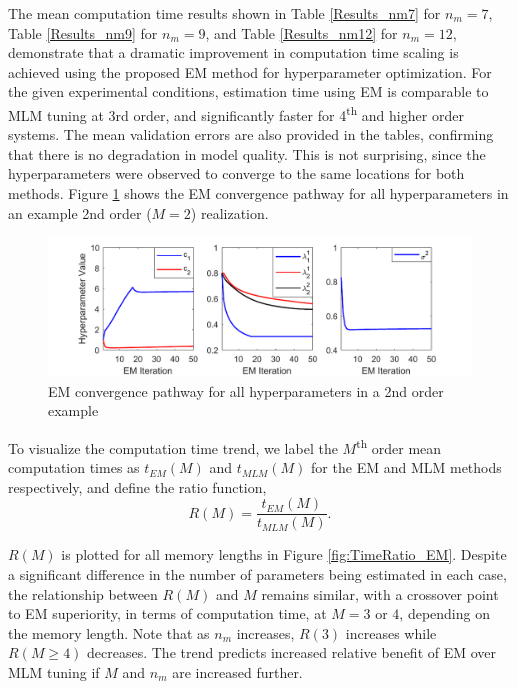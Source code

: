 The mean computation time results shown in Table \ref{Results_nm7} for $n_m = 7$, Table \ref{Results_nm9} for $n_m = 9$, and Table \ref{Results_nm12} for $n_m =12$, demonstrate that a dramatic improvement in computation time scaling is achieved using the proposed EM method for hyperparameter optimization. For the given experimental conditions, estimation time using EM is comparable to MLM tuning at 3rd order, and significantly faster for 4\textsuperscript{th} and higher order systems. The mean validation errors are also provided in the tables, confirming that there is no degradation in model quality. This is not surprising, since the hyperparameters were observed to converge to the same locations for both methods. Figure \ref{fig:EMhyperparams_converging} shows the EM convergence pathway for all hyperparameters in an example 2nd order ($M=2$) realization.

\begin{figure}[h]
\centering
\includegraphics[width = \textwidth]{Chapter4_EM/HyperparamConvergence.pdf}
\caption{EM convergence pathway for all hyperparameters in a 2nd order example}
\label{fig:EMhyperparams_converging}
\end{figure}

To visualize the computation time trend, we label the $M$\textsuperscript{th} order mean computation times as $t_{EM}(M)$ and $t_{MLM}(M)$ for the EM and MLM methods respectively, and define the ratio function, 
\begin{equation}
R(M) = \frac{t_{EM}(M)}{t_{MLM}(M)}.
\end{equation}

$R(M)$ is plotted for all memory lengths in Figure \ref{fig:TimeRatio_EM}. Despite a significant difference in the number of parameters being estimated in each case, the relationship between $R(M)$ and $M$ remains similar, with a crossover point to EM superiority, in terms of computation time, at $M=3 \text{ or } 4$, depending on the memory length. Note that as $n_m$ increases, $R(3)$ increases while $R(M\geq4)$ decreases. The trend predicts increased relative benefit of EM over MLM tuning if $M$ and $n_m$ are increased further. 

